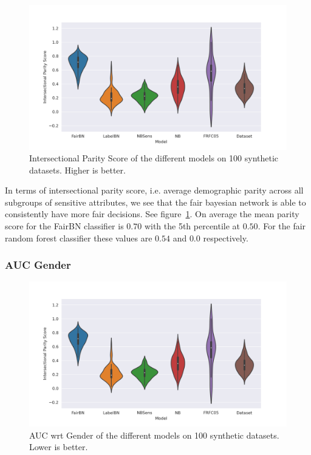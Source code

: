 \begin{figure}
    \centering
    \includegraphics[width=\linewidth]{figures/intparscore-synthetic.png}
    \caption{Intersectional Parity Score of the different models on 100 synthetic datasets. Higher is better.}
    \label{fig:intpar}
\end{figure}

In terms of intersectional parity score, i.e. average demographic parity across all subgroups of sensitive attributes, we see that the fair bayesian network is able to consistently have more fair decisions. See figure~\ref{fig:intpar}. On average the mean parity score for the FairBN classifier is $0.70$ with the 5th percentile at $0.50$. For the fair random forest classifier these values are $0.54$ and $0.0$ respectively.
 
\subsubsection{AUC Gender}

\begin{figure}
    \centering
    \includegraphics[width=\linewidth]{figures/intparscore-synthetic.png}
    \caption{AUC wrt Gender of the different models on 100 synthetic datasets. Lower is better.}
    \label{fig:aucgender}
\end{figure}

